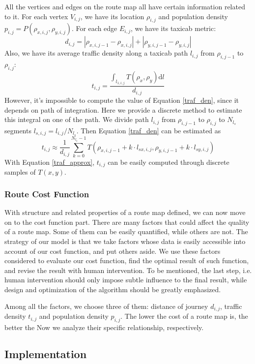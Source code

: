 \documentclass{mcmthesis}
\begin{document}
All the vertices and edges on the route map all have certain information related to it. For each vertex $V_{i, j}$, we have its location $\rho_{i, j}$ and population density $p_{i, j} = P(\rho_{x,i,j}, \rho_{y,i,j})$. For each edge $E_{i, j}$, we have its taxicab metric\cite{ManhatDist}: 
\begin{equation}
d_{i,j} = |\rho_{x,i,j-1} - \rho_{x,i,j}| + |\rho_{y,i,j-1} - \rho_{y,i,j}| 
\end{equation}
Also, we have its average traffic density along a taxicab path $l_{i,j}$ from $\rho_{i,j-1}$ to $\rho_{i, j}$:
\begin{equation}
t_{i,j} = \frac{\int_{l_{1,i,j}} T(\rho_{x}, \rho_{y})\mathrm{d}l}{d_{i,j}}
\label{traf_den}
\end{equation}
However, it's impossible to compute the value of Equation \ref{traf_den}, since it depends on path of integration. Here we provide a discrete method to estimate this integral on one of the path. We divide path $l_{i,j}$ from $\rho_{i,j-1}$ to $\rho_{i, j}$ to $N_{l_s}$ segments $l_{s, i, j} = l_{i,j}/N_{l_s}$. Then Equation \ref{traf_den} can be estimated as
\begin{equation}
t_{i,j} \approx \frac{1}{d_{i,j}}\sum\limits_{k=0}^{N_{l_s}-1} T(\rho_{x,i,j-1}+k\cdot l_{sx,i,j}, \rho_{y,i,j-1}+k\cdot l_{sy,i,j})
\label{traf_approx}
\end{equation}
With Equation \ref{traf_approx}, $t_{i,j}$ can be easily computed through discrete samples of $T(x,y)$. 

\subsubsection{Route Cost Function}
With structure and related properties of a route map defined, we can now move on to the cost function part. There are many factors that could affect the quality of a route map. Some of them can be easily quantified, while others are not. The strategy of our model is that we take factors whose data is easily accessible into account of our cost function, and put others aside. We use these factors considered to evaluate our cost function, find the optimal result of such function, and revise the result with human intervention. To be mentioned, the last step, i.e. human intervention should only impose subtle influence to the final result, while design and  optimization of the algorithm should be greatly emphasized.

Among all the factors, we choose three of them: distance of journey $d_{i,j}$, traffic density $t_{i,j}$ and population density $p_{i,j}$. The lower the cost of a route map is, the better the Now we analyze their specific relationship, respectively. 

\subsection{Implementation}
\end{document}
